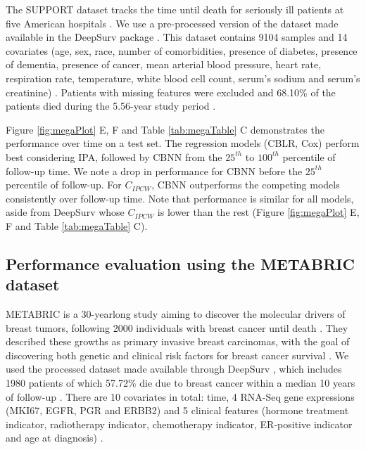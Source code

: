 \documentclass[AMA,STIX1COL,]{WileyNJD-v2}
\begin{document}
The SUPPORT dataset tracks the time until death for seriously ill
patients at five American hospitals \citep{knaus1995SUPPORT}. We use a
pre-processed version of the dataset made available in the DeepSurv
package \citep{katzman2018DeepSurv}. This dataset contains 9104 samples
and 14 covariates (age, sex, race, number of comorbidities, presence of
diabetes, presence of dementia, presence of cancer, mean arterial blood
pressure, heart rate, respiration rate, temperature, white blood cell
count, serum's sodium and serum's creatinine)
\citep{katzman2018DeepSurv}. Patients with missing features were
excluded and 68.10\% of the patients died during the 5.56-year study
period \citep{katzman2018DeepSurv}.

Figure \ref{fig:megaPlot} E, F and Table \ref{tab:megaTable} C
demonstrates the performance over time on a test set. The regression
models (CBLR, Cox) perform best considering IPA, followed by CBNN from
the \(25^{th}\) to \(100^{th}\) percentile of follow-up time. We note a
drop in performance for CBNN before the \(25^{th}\) percentile of
follow-up. For \(C_{IPCW}\), CBNN outperforms the competing models
consistently over follow-up time. Note that performance is similar for
all models, aside from DeepSurv whose \(C_{IPCW}\) is lower than the
rest (Figure \ref{fig:megaPlot} E, F and Table \ref{tab:megaTable} C).

\hypertarget{performance-evaluation-using-the-metabric-dataset}{%
\subsection{Performance evaluation using the METABRIC
dataset}\label{performance-evaluation-using-the-metabric-dataset}}

METABRIC is a 30-yearlong study aiming to discover the molecular drivers
of breast tumors, following 2000 individuals with breast cancer until
death \citep{curtis2012genomic}. They described these growths as primary
invasive breast carcinomas, with the goal of discovering both genetic
and clinical risk factors for breast cancer survival
\citep{curtis2012genomic}. We used the processed dataset made available
through DeepSurv \citep{katzman2018DeepSurv}, which includes 1980
patients of which 57.72\% die due to breast cancer within a median 10
years of follow-up \citep{katzman2018DeepSurv}. There are 10 covariates
in total: time, 4 RNA-Seq gene expressions (MKI67, EGFR, PGR and ERBB2)
and 5 clinical features (hormone treatment indicator, radiotherapy
indicator, chemotherapy indicator, ER-positive indicator and age at
diagnosis) \citep{katzman2018DeepSurv}.
\end{document}
